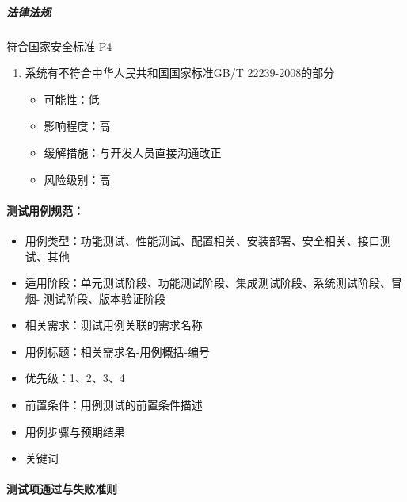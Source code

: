 \documentclass[hyperref, a4paper]{ctexart}
\providecommand{\tightlist}{%
  \setlength{\itemsep}{0pt}\setlength{\parskip}{0pt}}
\let\oldparagraph\paragraph
\renewcommand{\paragraph}[1]{\oldparagraph{#1}\mbox{}}
\let\oldsubparagraph\subparagraph
\renewcommand{\subparagraph}[1]{\oldsubparagraph{#1}\mbox{}}
\begin{document}
\hypertarget{ux6cd5ux5f8bux6cd5ux89c4}{%
\subparagraph{法律法规}\label{ux6cd5ux5f8bux6cd5ux89c4}}

符合国家安全标准-P4

\begin{enumerate}
\def\labelenumi{\arabic{enumi}.}
\tightlist
\item
  系统有不符合中华人民共和国国家标准GB/T 22239-2008的部分

  \begin{itemize}
  \tightlist
  \item
    可能性：低
  \item
    影响程度：高
  \item
    缓解措施：与开发人员直接沟通改正
  \item
    风险级别：高
  \end{itemize}
\end{enumerate}

\hypertarget{ux6d4bux8bd5ux7528ux4f8bux89c4ux8303}{%
\paragraph{测试用例规范：}\label{ux6d4bux8bd5ux7528ux4f8bux89c4ux8303}}

\begin{itemize}
\tightlist
\item
  用例类型：功能测试、性能测试、配置相关、安装部署、安全相关、接口测试、其他
\item
  适用阶段：单元测试阶段、功能测试阶段、集成测试阶段、系统测试阶段、冒烟-
  测试阶段、版本验证阶段
\item
  相关需求：测试用例关联的需求名称
\item
  用例标题：相关需求名-用例概括-编号
\item
  优先级：1、2、3、4
\item
  前置条件：用例测试的前置条件描述
\item
  用例步骤与预期结果
\item
  关键词
\end{itemize}

\hypertarget{ux6d4bux8bd5ux9879ux901aux8fc7ux4e0eux5931ux8d25ux51c6ux5219}{%
\paragraph{测试项通过与失败准则}\label{ux6d4bux8bd5ux9879ux901aux8fc7ux4e0eux5931ux8d25ux51c6ux5219}}
\end{document}
